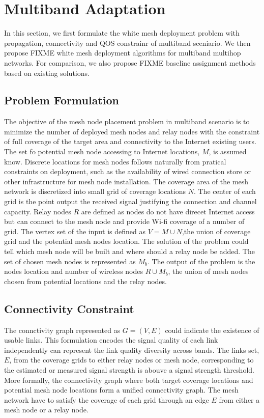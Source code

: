 \section{Multiband Adaptation}
\label{sec:model}

In this section, we first formulate the 
white mesh deployment problem
with propagation, connectivity and QOS constrainr of multiband sceniario.
We then propose {FIXME} white mesh deployment algorithms for multiband multihop networks. For comparison, we also propose {FIXME} baseline assignment methods based on existing solutions.

\subsection{Problem Formulation}
The objective of the mesh node placement problem in multiband scenario is to minimize the number of deployed mesh nodes and relay nodes with the constraint of full coverage of the target area and connectivity to the Internet existing users. 
The set fo potential mesh node accessing to Internet locations, $M$, is assumed know. 
Discrete locations for mesh nodes follows naturally from pratical constraints on deployment, such as the availability of wired connection store or other infrastructure for mesh node installation.
The coverage area of the mesh network is discretized into small grid of coverage locations $N$. The center of each grid is the point output the received signal justifying the connection and channel capacity.
Relay nodes $R$  are defined as nodes do not have direcet Internet access but can connect to the mesh node and provide Wi-fi coverage of a number of grid.
The vertex set of the input is defined as $V=M\cup N$,the union of  coverage grid and the potential mesh nodes location. 
The solution of the problem could tell which mesh node will be built and where should a relay node be added. The set of chosen mesh nodes is represented as $M_b$. 
The output of the problem is the nodes location and number of wireless nodes $R\cup M_b$, the union of mesh nodes chosen from potential locations and the relay nodes. 

\subsection{Connectivity Constraint}
\label{subsec:ccconstraint}
The connctivity graph represented as $G=(V,E)$ could indicate the existence of usable links. This formulation encodes the signal quality of each link independently can represent the link quality diversity across bands.
The links set, $E$, from the coverage grids to either relay nodes or mesh node, corresponding to the estimated or measured signal strength is abouve a signal strength threshold. 
More formally, the connectivity graph where both target coverage locations and potential mesh node locations form a unified connectivity graph.
The mesh network have to satisfy the coverage of each grid through an edge $E$ from either a mesh node or a relay node.





